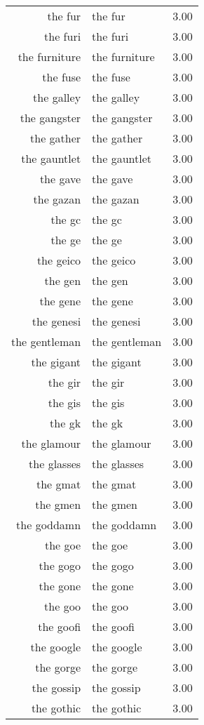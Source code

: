 \begin{table}[ht]
\begin{tabular}{rlr}
  the fur & the fur & 3.00 \\ 
  the furi & the furi & 3.00 \\ 
  the furniture & the furniture & 3.00 \\ 
  the fuse & the fuse & 3.00 \\ 
  the galley & the galley & 3.00 \\ 
  the gangster & the gangster & 3.00 \\ 
  the gather & the gather & 3.00 \\ 
  the gauntlet & the gauntlet & 3.00 \\ 
  the gave & the gave & 3.00 \\ 
  the gazan & the gazan & 3.00 \\ 
  the gc & the gc & 3.00 \\ 
  the ge & the ge & 3.00 \\ 
  the geico & the geico & 3.00 \\ 
  the gen & the gen & 3.00 \\ 
  the gene & the gene & 3.00 \\ 
  the genesi & the genesi & 3.00 \\ 
  the gentleman & the gentleman & 3.00 \\ 
  the gigant & the gigant & 3.00 \\ 
  the gir & the gir & 3.00 \\ 
  the gis & the gis & 3.00 \\ 
  the gk & the gk & 3.00 \\ 
  the glamour & the glamour & 3.00 \\ 
  the glasses & the glasses & 3.00 \\ 
  the gmat & the gmat & 3.00 \\ 
  the gmen & the gmen & 3.00 \\ 
  the goddamn & the goddamn & 3.00 \\ 
  the goe & the goe & 3.00 \\ 
  the gogo & the gogo & 3.00 \\ 
  the gone & the gone & 3.00 \\ 
  the goo & the goo & 3.00 \\ 
  the goofi & the goofi & 3.00 \\ 
  the google & the google & 3.00 \\ 
  the gorge & the gorge & 3.00 \\ 
  the gossip & the gossip & 3.00 \\ 
  the gothic & the gothic & 3.00 \\ 

\end{tabular}
\end{table}
